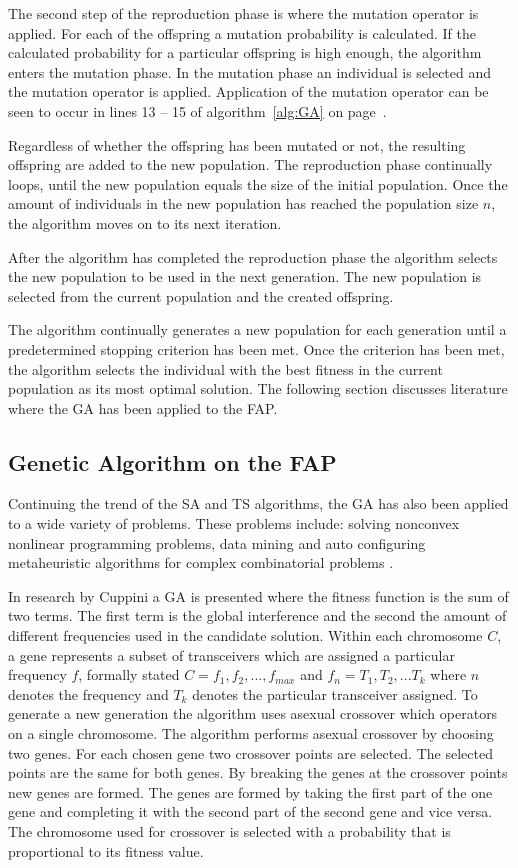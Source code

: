 The second step of the reproduction phase is where the mutation operator is applied. For each of the offspring a mutation probability is calculated. If the calculated probability for a particular offspring is high enough, the algorithm enters the mutation phase. In the mutation phase an individual is selected and the mutation operator is applied. Application of the mutation operator can be seen to occur in lines 13 -- 15 of algorithm~\ref{alg:GA} on page~\pageref{alg:GA}.

Regardless of whether the offspring has been mutated or not, the resulting offspring are added to the new population. The reproduction phase continually loops, until the new population equals the size of the initial population. Once the amount of individuals in the new population has reached the population size $n$, the algorithm moves on to its next iteration.

After the algorithm has completed the reproduction phase the algorithm selects the new population to be used in the next generation. The new population is selected from the current population and the created offspring.

The algorithm continually generates a new population for each generation until a predetermined stopping criterion has been met. Once the criterion has been met, the algorithm selects the individual with the best fitness in the current population as its most optimal solution. The following section discusses literature where the \gls{GA} has been applied to the \gls{FAP}.

\subsection{Genetic Algorithm on the \gls{FAP}}
\label{sec:gaonfap}
Continuing the trend of the \gls{SA} and \gls{TS} algorithms, the \gls{GA} has also been applied to a wide variety of problems. These problems include: solving nonconvex nonlinear programming problems\cite{GANonConvex}, data mining \cite{SelfAdaptiveDataMiningGA} and auto configuring metaheuristic algorithms for complex combinatorial problems \cite{AutoComplexMeta}.

In research by Cuppini\cite{GACuppini} a \gls{GA} is presented where the fitness function is the sum of two terms. The first term is the global interference and the second the amount of different frequencies used in the candidate solution. Within each chromosome $C$, a gene represents a subset of transceivers which are assigned a particular frequency $f$, formally stated $C = {f_1,f_2, ..., f_{max}}$ and $f_n = {T_1, T_2, ... T_k}$ where $n$ denotes the frequency and $T_k$ denotes the particular transceiver assigned. To generate a new generation the algorithm uses asexual crossover which operators on a single chromosome. The algorithm performs asexual crossover by choosing two genes. For each chosen gene two crossover points are selected. The selected points are the same for both genes. By breaking the genes at the crossover points new genes are formed. The genes are formed by taking the first part of the one gene and completing it with the second part of the second gene and vice versa. The chromosome used for crossover is selected with a probability that is proportional to its fitness value.

